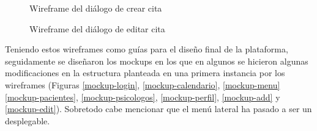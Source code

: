 \begin{figure}[H]
    \caption{Wireframe del diálogo de crear cita}
    \label{wireframe-crear-cita}
\end{figure}

\begin{figure}[H]
    \caption{Wireframe del diálogo de editar cita}
    \label{wireframe-editar-cita}
\end{figure}

Teniendo estos wireframes como guías para el diseño final de la plataforma, seguidamente se diseñaron los mockups en los que en algunos se hicieron algunas modificaciones en la estructura planteada en una primera instancia por los wireframes (Figuras \ref{mockup-login}, \ref{mockup-calendario}, \ref{mockup-menu} \ref{mockup-pacientes}, \ref{mockup-psicologos}, \ref{mockup-perfil}, \ref{mockup-add} y \ref{mockup-edit}). Sobretodo cabe mencionar que el menú lateral ha pasado a ser un desplegable. 

